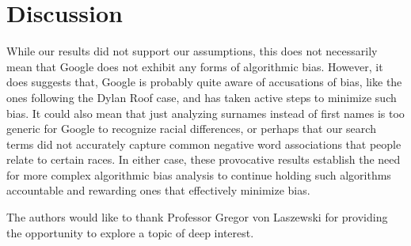 \documentclass[sigconf]{acmart}
\begin{document}
\section{Discussion}

While our results did not support our assumptions, this does not necessarily mean that Google does not exhibit any forms of algorithmic bias. However, it does suggests that, Google is probably quite aware of accusations of bias, like the ones following the Dylan Roof case, and has taken active steps to minimize such bias. It could also mean that just analyzing surnames instead of first names is too generic for Google to recognize racial differences, or perhaps that our search terms did not accurately capture common negative word associations that people relate to certain races. In either case, these provocative results establish the need for more complex algorithmic bias analysis to continue holding such algorithms accountable and rewarding ones that effectively minimize bias.

\begin{acks}
The authors would like to thank Professor Gregor von Laszewski for providing the opportunity to explore a topic of deep interest.

\end{acks}



 
\end{document}
